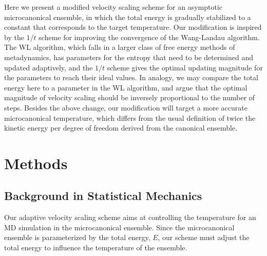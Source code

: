 \documentclass[reprint]{revtex4-1}
\begin{document}
Here we present a modified velocity scaling scheme
for an asymptotic microcanonical ensemble,
in which
the total energy is gradually stabilized to a constant
that corresponds to the target temperature.
%
Our modification is inspired by the $1/t$ scheme\cite{
  belardinelli2007, belardinelli2007jcp, belardinelli2008,
  zhou2005, zhou2008, morozov2007}
for improving the convergence of the Wang-Landau algorithm\cite{
  wang2001, wang2001pre}.
The WL algorithm,
which falls in a larger class of free energy methods
of metadynamics\cite{
  laio2002, laio2008, marsili2006},
has parameters for the entropy that need to be
determined and updated adaptively,
and the $1/t$ scheme gives the optimal updating magnitude
for the parameters to reach their ideal values.
%
In analogy, we may compare the total energy here
to a parameter in the WL algorithm,
and argue that the optimal magnitude
of velocity scaling should be inversely proportional
to the number of steps.
%
Besides the above change,
our modification will target a more accurate
microcanonical temperature\cite{rugh1997},
which differs from the usual definition of
twice the kinetic energy per degree of freedom
derived from the canonical ensemble.



\section{Methods}



\subsection{Background in Statistical Mechanics}



Our adaptive velocity scaling scheme aims at
controlling the temperature for an
MD simulation in the microcanonical ensemble.
%
Since the microcanonical ensemble is parameterized by
the total energy, $E$,
our scheme must adjust the total energy
to influence the temperature of the ensemble.
\end{document}
